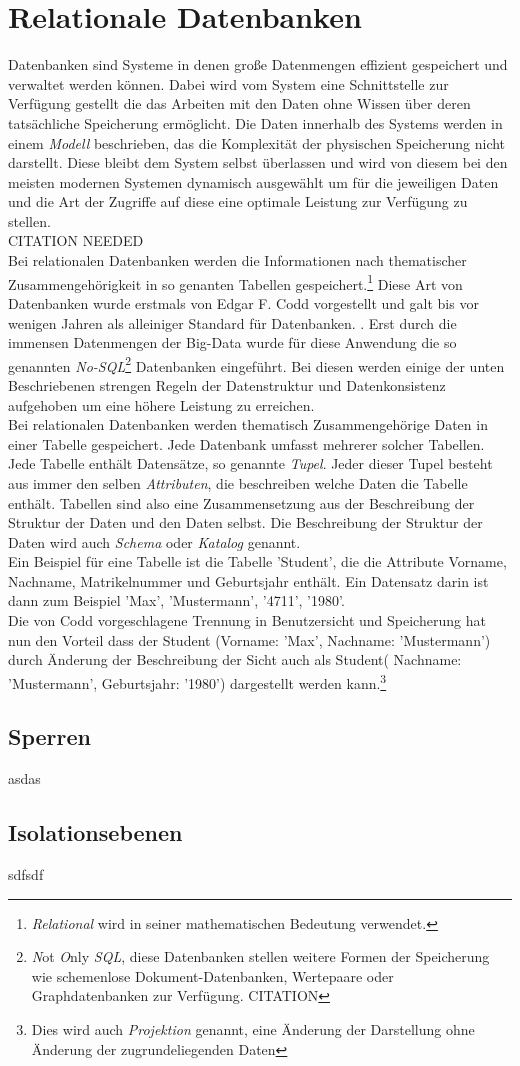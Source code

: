 \section{Relationale Datenbanken}
Datenbanken sind Systeme in denen große Datenmengen effizient gespeichert und verwaltet werden können. Dabei wird vom System eine Schnittstelle zur Verfügung gestellt die das Arbeiten mit den Daten ohne Wissen über deren tatsächliche Speicherung ermöglicht. Die Daten innerhalb des Systems werden in einem \emph{Modell} beschrieben, das die Komplexität der physischen Speicherung nicht darstellt. Diese bleibt dem System selbst überlassen und wird von diesem bei den meisten modernen Systemen dynamisch ausgewählt um für die jeweiligen Daten und die Art der Zugriffe auf diese eine optimale Leistung zur Verfügung zu stellen.
\\CITATION NEEDED
\\Bei relationalen Datenbanken werden die Informationen nach thematischer Zusammengehörigkeit in so genanten Tabellen gespeichert.\footnote{\emph{Relational} wird in seiner mathematischen Bedeutung verwendet.} Diese Art von Datenbanken wurde erstmals von Edgar F. Codd vorgestellt und galt bis vor wenigen Jahren als alleiniger Standard für Datenbanken. \cite[S. 133]{dbgrund}. Erst durch die immensen Datenmengen der Big-Data wurde für diese Anwendung die so genannten \emph{No-SQL}\footnote{\emph{N}ot \emph{O}nly \emph{SQL}, diese Datenbanken stellen weitere Formen der Speicherung wie schemenlose Dokument-Datenbanken, Wertepaare oder Graphdatenbanken zur Verfügung. CITATION } Datenbanken eingeführt. Bei diesen werden einige der unten Beschriebenen strengen Regeln der Datenstruktur und Datenkonsistenz aufgehoben um eine höhere Leistung zu erreichen.
\\Bei relationalen Datenbanken werden thematisch Zusammengehörige Daten in einer Tabelle gespeichert. Jede Datenbank umfasst mehrerer solcher Tabellen. Jede Tabelle enthält Datensätze, so genannte \emph{Tupel}. Jeder dieser Tupel besteht aus immer den selben \emph{Attributen}, die beschreiben welche Daten die Tabelle enthält. Tabellen sind also eine Zusammensetzung aus der Beschreibung der Struktur der Daten und den Daten selbst. Die Beschreibung der Struktur der Daten wird auch \emph{Schema} oder \emph{Katalog} genannt.
\\Ein Beispiel für eine Tabelle ist die Tabelle 'Student', die die Attribute Vorname, Nachname, Matrikelnummer und Geburtsjahr enthält. Ein Datensatz darin ist dann zum Beispiel 'Max', 'Mustermann', '4711', '1980'.\cite[S. 137]{dbgrund} \cite{DBLP:journals/cacm/Codd70}
\\Die von Codd vorgeschlagene Trennung in Benutzersicht und Speicherung hat nun den Vorteil dass der Student (Vorname: 'Max', Nachname: 'Mustermann') durch Änderung der Beschreibung der Sicht auch als Student( Nachname: 'Mustermann', Geburtsjahr: '1980') dargestellt werden kann.\footnote{Dies wird auch \emph{Projektion} genannt, eine Änderung der Darstellung ohne Änderung der zugrundeliegenden Daten}
\subsection{Sperren}
asdas
\subsection{Isolationsebenen}
sdfsdf

\chapterend
